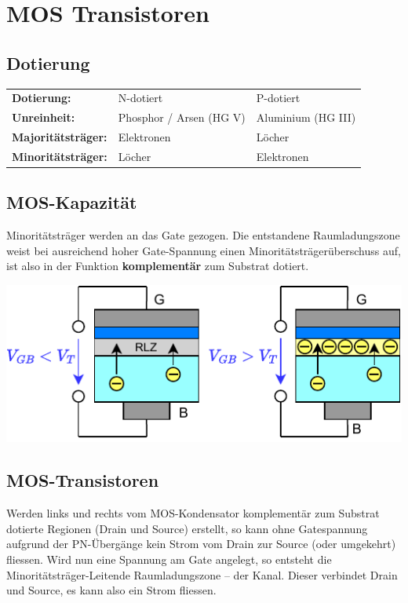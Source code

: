 \section{MOS Transistoren}

\subsection{Dotierung}
\begin{center}
    \begin{tabular}{lll}
        \textbf{Dotierung:}          & N-dotiert                & P-dotiert             \\
        \textbf{Unreinheit:}         & Phosphor / Arsen (HG V)  & Aluminium (HG III)    \\
        \textbf{Majoritätsträger:}   & Elektronen               & Löcher                \\
        \textbf{Minoritätsträger:}   & Löcher                   & Elektronen            \\
    \end{tabular}
\end{center}


\subsection{MOS-Kapazität}
\begin{minipage}[t]{0.49\columnwidth}
    Minoritätsträger werden an das Gate gezogen.
    Die entstandene Raumladungszone weist bei ausreichend hoher Gate-Spannung einen Minoritätsträgerüberschuss auf, ist also in der Funktion \textbf{komplementär} zum Substrat dotiert.
\end{minipage}
\hfill
\begin{minipage}[t]{0.49\columnwidth}
    \includegraphics[width=\columnwidth, align=t]{images/02_MOS_kapazitaet.pdf}
\end{minipage}


\subsection{MOS-Transistoren}
Werden links und rechts vom MOS-Kondensator komplementär zum Substrat dotierte Regionen (Drain und Source) erstellt, so kann ohne Gatespannung aufgrund der PN-Übergänge kein Strom vom Drain zur Source (oder umgekehrt) fliessen.
Wird nun eine Spannung am Gate angelegt, so entsteht die Minoritätsträger-Leitende Raumladungszone -- der Kanal.
Dieser verbindet Drain und Source, es kann also ein Strom fliessen.

